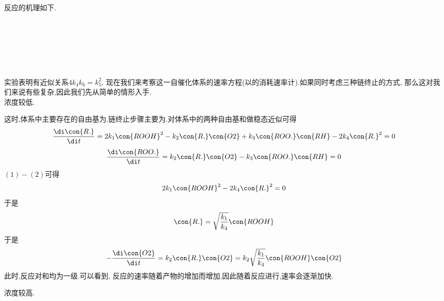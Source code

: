 \documentclass{ctexart}
\begin{document}
反应的机理如下.
\begin{tightcenter}
    \\
    \\
    \\
    \\
    \\
\end{tightcenter}
实验表明有近似关系$4k_4k_6=k_5^2$.%
现在我们来考察这一自催化体系的速率方程(以的消耗速率计).如果同时考虑三种链终止的方式,%
那么这对我们来说有些复杂,因此我们先从简单的情形入手.\\
\indent {} 浓度较低.
\begin{derivation}\setcounter{equation}{0}
    这时,体系中主要存在的自由基为,链终止步骤主要为.对体系中的两种自由基和做稳态近似可得
    \begin{equation}
        \dfrac{\di\con{R.}}{\di t}=2k_1\con{ROOH}^2-k_2\con{R.}\con{O2}+k_3\con{ROO.}\con{RH}-2k_4\con{R.}^2=0
    \end{equation}
    \begin{equation}
        \dfrac{\di\con{ROO.}}{\di t}=k_2\con{R.}\con{O2}-k_3\con{ROO.}\con{RH}=0
    \end{equation}
    $(1)-(2)$可得
    \begin{equation}
        2k_1\con{ROOH}^2-2k_4\con{R.}^2=0
    \end{equation}
    于是
    \begin{equation}
        \con{R.}=\sqrt{\dfrac{k_1}{k_4}}\con{ROOH}
    \end{equation}
    于是
    \begin{equation}
        -\dfrac{\di\con{O2}}{\di t}=k_2\con{R.}\con{O2}=k_2\sqrt{\dfrac{k_1}{k_4}}\con{ROOH}\con{O2}
    \end{equation}
    此时,反应对和均为一级.可以看到,%
    反应的速率随着产物的增加而增加,因此随着反应进行,速率会逐渐加快.
\end{derivation}
 浓度较高.
\end{document}
